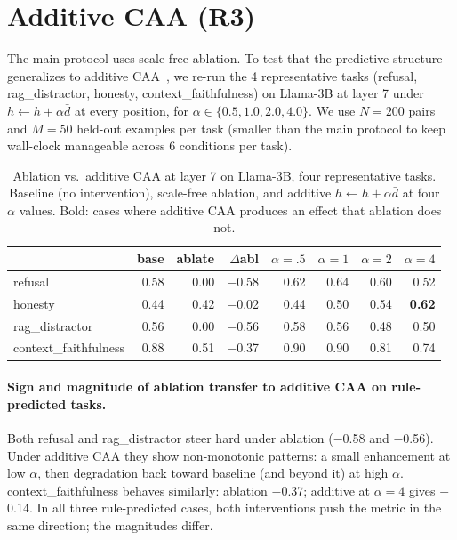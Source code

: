 \documentclass[11pt]{article}
\begin{document}
\section{Additive CAA (R3)}
\label{app:additive}

The main protocol uses scale-free ablation. To test that the
predictive structure generalizes to additive CAA~\citep{rimsky2023steering},
we re-run the 4 representative tasks (refusal, rag\_distractor,
honesty, context\_faithfulness) on Llama-3B at layer 7 under
$h \leftarrow h + \alpha \bar d$ at every position, for
$\alpha \in \{0.5, 1.0, 2.0, 4.0\}$. We use $N=200$ pairs and
$M=50$ held-out examples per task (smaller than the main protocol
to keep wall-clock manageable across 6 conditions per task).

\begin{table}[h]
\centering\footnotesize
\setlength{\tabcolsep}{3pt}
\begin{tabular}{l r r r r r r r}
\toprule
& base & ablate & $\Delta$abl & $\alpha{=}.5$ & $\alpha{=}1$ & $\alpha{=}2$ & $\alpha{=}4$ \\
\midrule
refusal              & 0.58 & 0.00 & $-$0.58 & 0.62 & 0.64 & 0.60 & 0.52 \\
honesty              & 0.44 & 0.42 & $-$0.02 & 0.44 & 0.50 & 0.54 & \textbf{0.62} \\
rag\_distractor      & 0.56 & 0.00 & $-$0.56 & 0.58 & 0.56 & 0.48 & 0.50 \\
context\_faithfulness & 0.88 & 0.51 & $-$0.37 & 0.90 & 0.90 & 0.81 & 0.74 \\
\bottomrule
\end{tabular}
\caption{Ablation vs.~additive CAA at layer 7 on Llama-3B,
four representative tasks. Baseline (no intervention), scale-free
ablation, and additive $h \leftarrow h + \alpha \bar d$ at four
$\alpha$ values. Bold: cases where additive CAA produces an effect
that ablation does not.}
\label{tab:additive}
\end{table}

\paragraph{Sign and magnitude of ablation transfer to additive CAA
on rule-predicted tasks.}
Both refusal and rag\_distractor steer hard under ablation
($-$0.58 and $-$0.56). Under additive CAA they show non-monotonic
patterns: a small enhancement at low $\alpha$, then degradation back
toward baseline (and beyond it) at high $\alpha$. context\_faithfulness
behaves similarly: ablation $-$0.37; additive at $\alpha=4$
gives $-$0.14. In all three rule-predicted cases, both interventions
push the metric in the same direction; the magnitudes differ.
\end{document}
